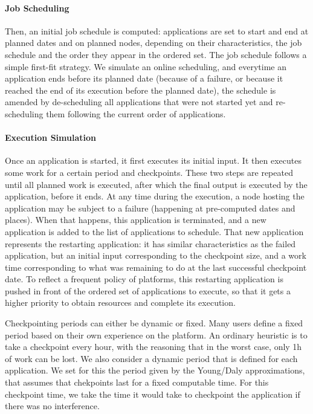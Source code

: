 \documentclass[conference]{IEEEtran}
\begin{document}
\paragraph*{Job Scheduling}
Then, an initial job schedule is computed: applications are set to
start and end at planned dates and on planned nodes, depending on
their characteristics, the job schedule and the order they appear in
the ordered set. The job schedule follows a simple first-fit
strategy. We simulate an online scheduling, and everytime an
application ends before its planned date (because of a failure, or
because it reached the end of its execution before the planned date),
the schedule is amended by de-scheduling all applications that were
not started yet and re-scheduling them following the current order of
applications.

\paragraph*{Execution Simulation}
Once an application is started, it first executes its initial
input. It then executes some work for a certain period and
checkpoints. These two steps are repeated until all planned work is
executed, after which the final output is executed by the application,
before it ends. At any time during the execution, a node hosting the
application may be subject to a failure (happening at pre-computed
dates and places). When that happens, this application is terminated,
and a new application is added to the list of applications to
schedule. That new application represents the restarting application:
it has similar characteristics as the failed application, but an
initial input corresponding to the checkpoint size, and a work time
corresponding to what was remaining to do at the last successful
checkpoint date. To reflect a frequent policy of platforms, this
restarting application is pushed in front of the ordered set of
applications to execute, so that it gets a higher priority to obtain
resources and complete its execution.

Checkpointing periods can either be dynamic or fixed. Many users
define a fixed period based on their own experience on the
platform. An ordinary heuristic is to take a checkpoint every hour,
with the reasoning that in the worst case, only 1h of work can be
lost. We also consider a dynamic period that is defined for each
application. We set for this the period given by the Young/Daly
approximations, that assumes that chekpoints last for a fixed
computable time. For this checkpoint time, we take the time it would
take to checkpoint the application if there was no interference.
\end{document}

